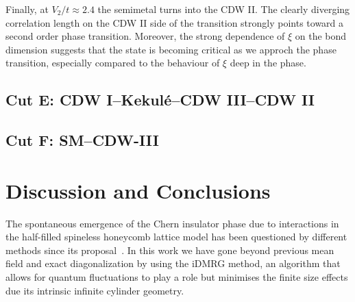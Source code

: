 \documentclass[aps,prx,10pt,twocolumn,floatfix,superscriptaddress,showpacs,numerical,footinbib]{revtex4-1}
\begin{document}
Finally, at $V_2/t \approx 2.4$ the semimetal turns into the CDW II.
%
The clearly diverging correlation length on the CDW II side of the transition strongly points toward a second order phase transition.
%
Moreover, the strong dependence of $\xi$ on the bond dimension suggests that the state is becoming critical as we approch the phase transition, especially compared to the behaviour of $\xi$ deep in the phase.


\subsection{Cut E: CDW I--Kekul\'e--CDW III--CDW II}

\subsection{Cut F: SM--CDW-III}


% 




%
\section{\label{sec:discconc}Discussion and Conclusions}
%

The spontaneous emergence of the Chern insulator phase due to interactions in the half-filled spineless honeycomb lattice
model has been questioned by different methods since its proposal~\cite{RQHZ08,WF10,GCC13,GGNVC13,DH14,DCH14}.
%
In this work we have gone beyond previous mean field and exact diagonalization by using the iDMRG method, an algorithm that allows for quantum fluctuations
to play a role but minimises the finite size effects due its intrinsic infinite cylinder geometry.
\end{document}
